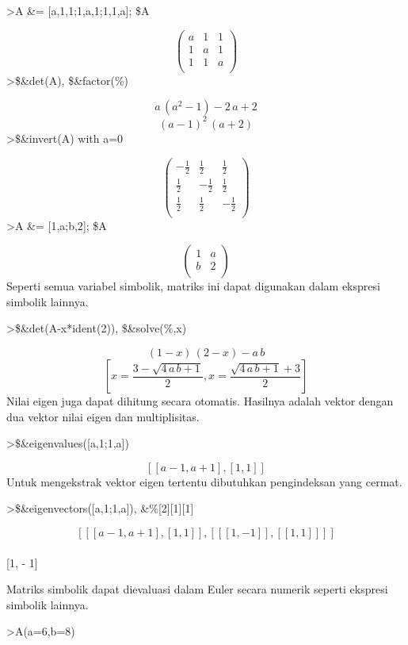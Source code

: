 \documentclass[
]{book}
\begin{document}
\textgreater A \&= {[}a,1,1;1,a,1;1,1,a{]}; \$A

\[\begin{pmatrix}a & 1 & 1 \\ 1 & a & 1 \\ 1 & 1 & a \\ \end{pmatrix}\]\textgreater\$\&det(A), \$\&factor(\%)

\[a\,\left(a^2-1\right)-2\,a+2\] \[\left(a-1\right)^2\,\left(a+2\right)\]\textgreater\$\&invert(A) with a=0

\[\begin{pmatrix}-\frac{1}{2} & \frac{1}{2} & \frac{1}{2} \\ \frac{1}{2} & -\frac{1}{2} & \frac{1}{2} \\ \frac{1}{2} & \frac{1}{2} & - \frac{1}{2} \\ \end{pmatrix}\]\textgreater A \&= {[}1,a;b,2{]}; \$A

\[\begin{pmatrix}1 & a \\ b & 2 \\ \end{pmatrix}\]Seperti semua variabel simbolik, matriks ini dapat digunakan dalam ekspresi simbolik lainnya.

\textgreater\$\&det(A-x*ident(2)), \$\&solve(\%,x)

\[\left(1-x\right)\,\left(2-x\right)-a\,b\] \[\left[ x=\frac{3-\sqrt{4\,a\,b+1}}{2} , x=\frac{\sqrt{4\,a\,b+1}+3}{2} \right]\]Nilai eigen juga dapat dihitung secara otomatis. Hasilnya adalah vektor dengan dua vektor nilai eigen dan multiplisitas.

\textgreater\$\&eigenvalues({[}a,1;1,a{]})

\[\left[ \left[ a-1 , a+1 \right]  , \left[ 1 , 1 \right]  \right]\]Untuk mengekstrak vektor eigen tertentu dibutuhkan pengindeksan yang cermat.

\textgreater\$\&eigenvectors({[}a,1;1,a{]}), \&\%{[}2{]}{[}1{]}{[}1{]}

\[\left[ \left[ \left[ a-1 , a+1 \right]  , \left[ 1 , 1 \right] \right]  , \left[ \left[ \left[ 1 , -1 \right]  \right]  ,\left[\left[ 1 , 1 \right]  \right]  \right]  \right]\]\\
{[}1, - 1{]}

Matriks simbolik dapat dievaluasi dalam Euler secara numerik seperti ekspresi simbolik lainnya.

\textgreater A(a=6,b=8)
\end{document}
